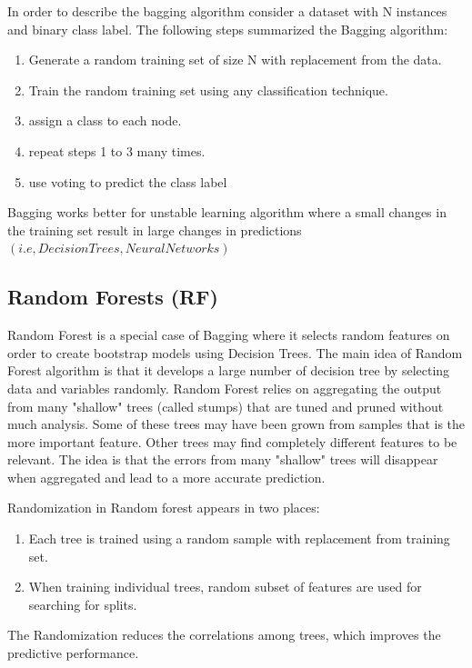 \documentclass[runningheads,a4paper]{llncs}
\begin{document}
In order to describe the bagging algorithm consider a dataset with N instances and binary class label. The following steps summarized the Bagging algorithm:

\begin{enumerate}
\item Generate a random training set of size N with replacement from the data.
\item Train the random training set using any classification technique.
\item assign a class to each node.
\item repeat steps 1 to 3  many times.
\item use voting to predict the class label

\end{enumerate}

Bagging works better for unstable  learning algorithm where a small changes in the training set result in large changes in predictions $(i.e, Decision Trees,  Neural Networks)$

\subsection{Random Forests (RF)}
Random Forest \cite{breiman2001random} is a special case of Bagging where it selects  random features on order to create bootstrap models using Decision Trees. The main idea of Random Forest algorithm is that it develops a large number of decision tree by selecting data and variables randomly.
Random Forest relies on aggregating the output from many "shallow" trees (called stumps) that are tuned and pruned without much analysis. Some of these trees may have been grown from samples that is the more important feature. Other trees may find completely different features to be relevant.  The idea is that the errors from many "shallow" trees will disappear when aggregated and lead to a more accurate prediction. 

Randomization in Random forest appears in two places:
\begin{enumerate}
\item Each tree is trained using a random sample with replacement from training set.
\item When training individual trees, random subset of features are used for searching for splits. 
\end{enumerate}

The Randomization reduces the correlations among trees, which improves the predictive performance.
\end{document}
